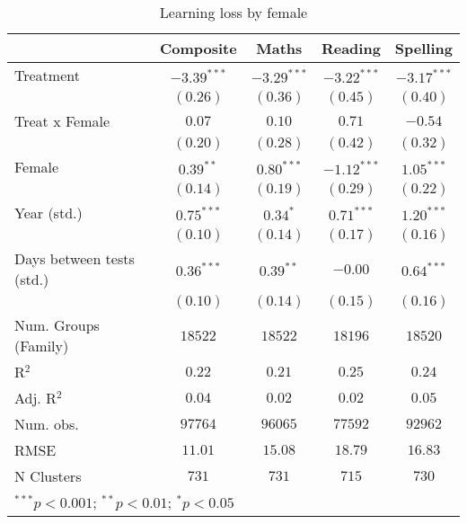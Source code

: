 
\begin{table}
\begin{center}
\begin{tabular}{l c c c c}
\hline
 & Composite & Maths & Reading & Spelling \\
\hline
Treatment                 & $-3.39^{***}$ & $-3.29^{***}$ & $-3.22^{***}$ & $-3.17^{***}$ \\
                          & $(0.26)$      & $(0.36)$      & $(0.45)$      & $(0.40)$      \\
Treat x Female            & $0.07$        & $0.10$        & $0.71$        & $-0.54$       \\
                          & $(0.20)$      & $(0.28)$      & $(0.42)$      & $(0.32)$      \\
Female                    & $0.39^{**}$   & $0.80^{***}$  & $-1.12^{***}$ & $1.05^{***}$  \\
                          & $(0.14)$      & $(0.19)$      & $(0.29)$      & $(0.22)$      \\
Year (std.)               & $0.75^{***}$  & $0.34^{*}$    & $0.71^{***}$  & $1.20^{***}$  \\
                          & $(0.10)$      & $(0.14)$      & $(0.17)$      & $(0.16)$      \\
Days between tests (std.) & $0.36^{***}$  & $0.39^{**}$   & $-0.00$       & $0.64^{***}$  \\
                          & $(0.10)$      & $(0.14)$      & $(0.15)$      & $(0.16)$      \\
\hline
Num. Groups (Family)      & $18522$       & $18522$       & $18196$       & $18520$       \\
R$^2$                     & $0.22$        & $0.21$        & $0.25$        & $0.24$        \\
Adj. R$^2$                & $0.04$        & $0.02$        & $0.02$        & $0.05$        \\
Num. obs.                 & $97764$       & $96065$       & $77592$       & $92962$       \\
RMSE                      & $11.01$       & $15.08$       & $18.79$       & $16.83$       \\
N Clusters                & $731$         & $731$         & $715$         & $730$         \\
\hline
\multicolumn{5}{l}{\scriptsize{$^{***}p<0.001$; $^{**}p<0.01$; $^{*}p<0.05$}}
\end{tabular}
\caption{Learning loss by female}
\label{tablefemale}
\end{center}
\end{table}
